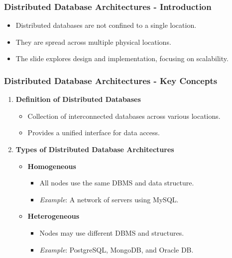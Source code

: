 \documentclass[aspectratio=169]{beamer}
\begin{document}
\begin{frame}[fragile]
    \frametitle{Distributed Database Architectures - Introduction}
    \begin{itemize}
        \item Distributed databases are not confined to a single location.
        \item They are spread across multiple physical locations.
        \item The slide explores design and implementation, focusing on scalability.
    \end{itemize}
\end{frame}

\begin{frame}[fragile]
    \frametitle{Distributed Database Architectures - Key Concepts}
    \begin{enumerate}
        \item \textbf{Definition of Distributed Databases}
            \begin{itemize}
                \item Collection of interconnected databases across various locations.
                \item Provides a unified interface for data access.
            \end{itemize}
        
        \item \textbf{Types of Distributed Database Architectures}
            \begin{itemize}
                \item \textbf{Homogeneous}
                    \begin{itemize}
                        \item All nodes use the same DBMS and data structure. 
                        \item \textit{Example}: A network of servers using MySQL.
                    \end{itemize}
                \item \textbf{Heterogeneous}
                    \begin{itemize}
                        \item Nodes may use different DBMS and structures.
                        \item \textit{Example}: PostgreSQL, MongoDB, and Oracle DB.
                    \end{itemize}
            \end{itemize}
    \end{enumerate}
\end{frame}
\end{document}
